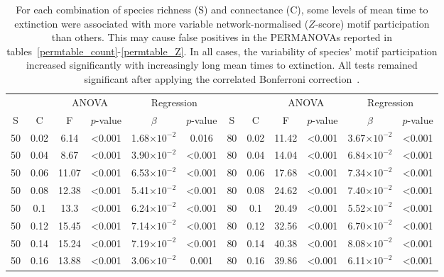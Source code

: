 \documentclass[12pt]{article}
\begin{document}
\begin{spacing}{2.0}
		\begin{table}[hb!]
			\caption{For each combination of species richness (S) and connectance (C), some levels of mean time to extinction were associated with more variable network-normalised ($Z$-score) motif participation than others. This may cause false positives in the PERMANOVAs reported in tables~\ref{permtable_count}-\ref{permtable_Z}. In all cases, the variability of species' motif participation increased significantly with increasingly long mean times to extinction. All tests remained significant after applying the correlated Bonferroni correction~\citep{Drezner2016}.}
			\label{betadisp_Z}
			\footnotesize
			\begin{tabular}{c c | c c| c c ||c c | c c | c c |}
            &&\multicolumn{2}{c|}{ANOVA}&\multicolumn{2}{c||}{Regression}&&&\multicolumn{2}{c|}{ANOVA}&\multicolumn{2}{c|}{Regression}\\
            S&C&F&$p$-value&$\beta$&$p$-value&S&C&F&$p$-value&$\beta$&$p$-value\\
            \hline
            50  & 0.02  & 6.14  & \textless0.001  & 1.68$\times10^{-2}$ & 0.016 & 80  & 0.02  & 11.42 & \textless0.001  & 3.67$\times10^{-2}$ & \textless0.001  \\
            50  & 0.04  & 8.67  & \textless0.001  & 3.90$\times10^{-2}$ & \textless0.001  & 80  & 0.04  & 14.04 & \textless0.001  & 6.84$\times10^{-2}$ & \textless0.001  \\
            50  & 0.06  & 11.07 & \textless0.001  & 6.53$\times10^{-2}$ & \textless0.001  & 80  & 0.06  & 17.68 & \textless0.001  & 7.34$\times10^{-2}$ & \textless0.001  \\
            50  & 0.08  & 12.38 & \textless0.001  & 5.41$\times10^{-2}$ & \textless0.001  & 80  & 0.08  & 24.62 & \textless0.001  & 7.40$\times10^{-2}$ & \textless0.001  \\
            50  & 0.1 & 13.3  & \textless0.001  & 6.24$\times10^{-2}$ & \textless0.001  & 80  & 0.1 & 20.49 & \textless0.001  & 5.52$\times10^{-2}$ & \textless0.001  \\
            50  & 0.12  & 15.45 & \textless0.001  & 7.14$\times10^{-2}$ & \textless0.001  & 80  & 0.12  & 32.56 & \textless0.001  & 6.70$\times10^{-2}$ & \textless0.001  \\
            50  & 0.14  & 15.24 & \textless0.001  & 7.19$\times10^{-2}$ & \textless0.001  & 80  & 0.14  & 40.38 & \textless0.001  & 8.08$\times10^{-2}$ & \textless0.001  \\
            50  & 0.16  & 13.88 & \textless0.001  & 3.06$\times10^{-2}$ & 0.001 & 80  & 0.16  & 39.86 & \textless0.001  & 6.11$\times10^{-2}$ & \textless0.001  \\

\end{tabular}
\end{table}
\end{spacing}
\end{document}
